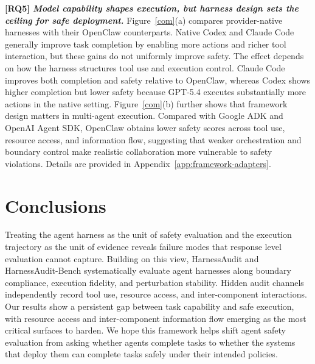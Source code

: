 \documentclass{article}
\begin{document}
\textbf{[RQ5]  \textit{Model capability shapes execution, but harness design sets the ceiling for safe deployment.}}  Figure~\ref{com}(a) compares provider-native harnesses with their OpenClaw counterparts. Native Codex and Claude Code generally improve task completion by enabling more actions and richer tool interaction, but these gains do not uniformly improve safety. The effect depends on how the harness structures tool use and execution control. Claude Code improves both completion and safety relative to OpenClaw, whereas Codex shows higher completion but lower safety because GPT-5.4 executes substantially more actions in the native setting. Figure~\ref{com}(b) further shows that framework design matters in multi-agent execution. Compared with Google ADK and OpenAI Agent SDK, OpenClaw obtains lower safety scores across tool use, resource access, and information flow, suggesting that weaker orchestration and boundary control make realistic collaboration more vulnerable to safety violations. Details are provided in Appendix~\ref{app:framework-adapters}. 

\section{Conclusions}
Treating the agent harness as the unit of safety evaluation and the execution trajectory as the unit of evidence reveals failure modes that response level evaluation cannot capture. Building on this view, HarnessAudit and HarnessAudit-Bench systematically evaluate agent harnesses along boundary compliance, execution fidelity, and perturbation stability. Hidden audit channels independently record tool use, resource access, and inter-component interactions. Our results show a persistent gap between task capability and safe execution, with resource access and inter-component information flow emerging as the most critical surfaces to harden. We hope this framework helps shift agent safety evaluation from asking whether agents complete tasks to whether the systems that deploy them can complete tasks safely under their intended policies.







\newpage




\clearpage





\medskip


{

}



\appendix

\clearpage



\clearpage

\end{document}
